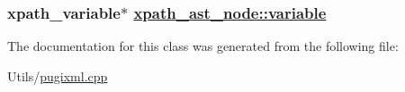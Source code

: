 \hypertarget{classxpath__ast__node_0fd3b0d8f930836105eeff6e2efa5ad3}{
\subsubsection[variable]{\setlength{\rightskip}{0pt plus 5cm}xpath\_\-variable$\ast$ \hyperlink{classxpath__ast__node_0fd3b0d8f930836105eeff6e2efa5ad3}{xpath\_\-ast\_\-node::variable}}}
\label{classxpath__ast__node_0fd3b0d8f930836105eeff6e2efa5ad3}




The documentation for this class was generated from the following file:\begin{CompactItemize}
\item 
Utils/\hyperlink{pugixml_8cpp}{pugixml.cpp}\end{CompactItemize}
